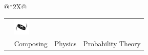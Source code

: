\documentclass{resume}
\begin{document}
\begin{center}
\begin{tabularx}{\linewidth}{@{}*{2}{X}@{}}
{{\begin{tabularx}{\linewidth}{@{}*{4}{>{\centering\arraybackslash}X}@{}}
{            } &
            {\centering
            \includegraphics[width=0.8cm]{images/probability.png}
            } \\
            {\footnotesize Animation} & {\footnotesize Composing} & {\footnotesize Physics} & {\footnotesize Probability Theory}
        \end{tabularx}
    }
}
\end{tabularx}
\end{center}
\end{document}
